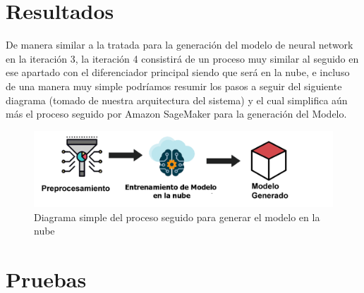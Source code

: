 \documentclass[12pt, a4paper, titlepage]{report}
\begin{document}
	\section{Resultados}
	De manera similar a la tratada para la generación del modelo de neural network en la iteración 3, la iteración 4 consistirá de un proceso muy similar al seguido en ese apartado con el diferenciador principal siendo que será en la nube, e incluso de una manera muy simple podríamos resumir los pasos a seguir del siguiente diagrama (tomado de nuestra arquitectura del sistema) y el cual simplifica aún más el proceso seguido por Amazon SageMaker para la generación del Modelo.
		
	\begin{figure}[H]
	\includegraphics[width=12cm]{./imagenes/Disenio/Iteracion_4/resultado_arquitectura.png}
	\centering 
	\caption{Diagrama simple del proceso seguido para generar el modelo en la nube}
	\end{figure}
	
	\newpage
	
	\section{Pruebas}
	
\end{document}
